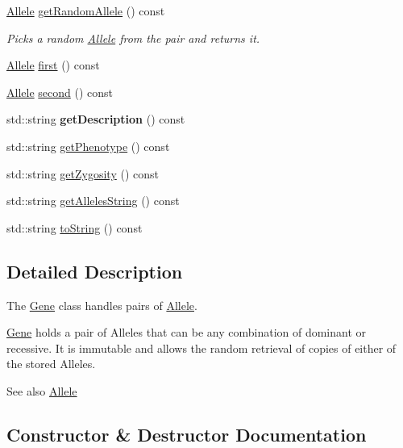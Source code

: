 \begin{DoxyCompactItemize}
\hyperlink{class_allele}{Allele} \hyperlink{class_gene_a7b631b7a53729db7523430049c89e463}{get\+Random\+Allele} () const 
\begin{DoxyCompactList}\small\item\em Picks a random \hyperlink{class_allele}{Allele} from the pair and returns it. \end{DoxyCompactList}\item 
\hyperlink{class_allele}{Allele} \hyperlink{class_gene_a935e5f290b1e66b970ed8b52a97b1ae9}{first} () const 
\item 
\hyperlink{class_allele}{Allele} \hyperlink{class_gene_a7c744b5c6e8d305c47c1563cc0e2acc8}{second} () const 
\item 
std\+::string {\bfseries get\+Description} () const \hypertarget{class_gene_ad25e29f23ead79aa820a6df83ce37f21}{}\label{class_gene_ad25e29f23ead79aa820a6df83ce37f21}

\item 
std\+::string \hyperlink{class_gene_a97e77e08f0ade2ebe413aab5a2160007}{get\+Phenotype} () const 
\item 
std\+::string \hyperlink{class_gene_a9b88c16c2408458ca43a82cdc4d5cbe3}{get\+Zygosity} () const 
\item 
std\+::string \hyperlink{class_gene_ab4b2614b4481851fcbd61860c464406f}{get\+Alleles\+String} () const 
\item 
std\+::string \hyperlink{class_gene_a3d5569b6329c23acf791ce310735fc5d}{to\+String} () const 
\end{DoxyCompactItemize}


\subsection{Detailed Description}
The \hyperlink{class_gene}{Gene} class handles pairs of \hyperlink{class_allele}{Allele}. 

\hyperlink{class_gene}{Gene} holds a pair of Alleles that can be any combination of dominant or recessive. It is immutable and allows the random retrieval of copies of either of the stored Alleles. \begin{DoxySeeAlso}{See also}
\hyperlink{class_allele}{Allele} 
\end{DoxySeeAlso}


\subsection{Constructor \& Destructor Documentation}
